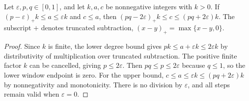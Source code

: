 \begin{lemma}
Let $\varepsilon,p,q\in[0,1]$, and let $k,a,c$ be nonnegative integers with $k>0$.
If $(p-\varepsilon)_+k\leq a\leq\varepsilon k$ and $c\leq a$, then
$(pq-2\varepsilon)_+k\leq c\leq(pq+2\varepsilon)k$.
The subscript $+$ denotes truncated subtraction, $(x-y)_+=\max\{x-y,0\}$.
\end{lemma}
\begin{proof}
Since $k$ is finite, the lower degree bound gives $pk\leq a+\varepsilon k\leq2\varepsilon k$ by distributivity of multiplication over truncated subtraction.
The positive finite factor $k$ can be cancelled, giving $p\leq2\varepsilon$.
Then $pq\leq p\leq2\varepsilon$ because $q\leq1$, so the lower window endpoint is zero.
For the upper bound, $c\leq a\leq\varepsilon k\leq(pq+2\varepsilon)k$ by nonnegativity and monotonicity.
There is no division by $\varepsilon$, and all steps remain valid when $\varepsilon=0$.
\end{proof}
